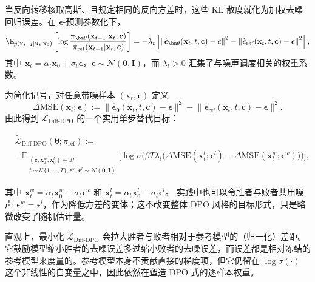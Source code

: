 当反向转移核取高斯、且规定相同的反向方差时，这些 KL 散度就化为加权去噪回归误差。在 $\boldsymbol\epsilon$-预测参数化下，
\begin{align}
\E_{p(\mathbf x_{t-1}|\mathbf x_t,\mathbf x_0)}
\left[
\log
\frac{
\pi_{\bm\theta}(\mathbf x_{t-1}|\mathbf x_t,\mathbf c)
}{
\pi_{\mathrm{ref}}(\mathbf x_{t-1}|\mathbf x_t,\mathbf c)
}
\right]
=
-\lambda_t
\left[
\left\|
\hat{\boldsymbol\epsilon}_{\bm\theta}(\mathbf x_t,t,\mathbf c)
-\boldsymbol\epsilon
\right\|^2
-
\left\|
\hat{\boldsymbol\epsilon}_{\mathrm{ref}}(\mathbf x_t,t,\mathbf c)
-\boldsymbol\epsilon
\right\|^2
\right],
\end{align}
其中 $\mathbf x_t
=
\alpha_t\mathbf x_0
+
\sigma_t\boldsymbol\epsilon$，$\boldsymbol\epsilon\sim\mathcal N(\mathbf 0,\mathbf I)$，而 $\lambda_t>0$ 汇集了与噪声调度相关的权重系数。

为简化记号，对任意带噪样本 $(\mathbf x_t,\boldsymbol\epsilon)$ 定义
\[
\Delta\mathrm{MSE}(\mathbf x_t;\boldsymbol\epsilon)
:= \big\|\hat{\boldsymbol\epsilon}_{\bm\theta}(\mathbf x_t,t,\mathbf c)-\boldsymbol\epsilon\big\|^2
 - \big\|\hat{\boldsymbol\epsilon}_{\mathrm{ref}}(\mathbf x_t,t,\mathbf c)-\boldsymbol\epsilon\big\|^2.
\]
由此得到 $\mathcal L_{\mathrm{Diff\text{-}DPO}}$ 的一个实用单步替代目标：
\begin{mdframed}
\begin{align*}
    &\tilde{\mathcal L}_{\mathrm{Diff\text{-}DPO}}(\bm\theta;\pi_{\mathrm{ref}})
    :=
    \\&-\mathbb E_{\substack{(\mathbf c,\mathbf x_0^w,\mathbf x_0^l)\sim\mathcal D\\
    t\sim\mathcal U\{1,\dots,T\}, \boldsymbol\epsilon^w,\boldsymbol\epsilon^l\sim\mathcal N(\mathbf 0,\mathbf I)}}
    \Big[
    \log\sigma \Big(
    \beta T\lambda_t\big(\Delta\mathrm{MSE}(\mathbf x_t^l;\boldsymbol\epsilon^l)-\Delta\mathrm{MSE}(\mathbf x_t^w;\boldsymbol\epsilon^w)\big)
    \Big)
    \Big],
\end{align*}
\end{mdframed}
其中
$\mathbf x_t^w=\alpha_t\mathbf x_0^w+\sigma_t\boldsymbol\epsilon^w$
和
$\mathbf x_t^l=\alpha_t\mathbf x_0^l+\sigma_t\boldsymbol\epsilon^l$。
实践中也可以令胜者与败者共用噪声 $\boldsymbol\epsilon^w=\boldsymbol\epsilon^l$，作为降低方差的变体；这不改变整体 DPO 风格的目标形式，只是略微改变了随机估计量。

直观上，最小化 $\tilde{\mathcal L}_{\mathrm{Diff\text{-}DPO}}$ 会拉大胜者与败者相对于参考模型的（归一化）差距。它鼓励模型缩小胜者的去噪误差多过缩小败者的去噪误差，而误差都是相对冻结的参考模型来度量的。参考模型本身不贡献直接的梯度项，但它仍留在 $\log\sigma(\cdot)$ 这个非线性的自变量之中，因此依然在塑造 DPO 式的逐样本权重。


